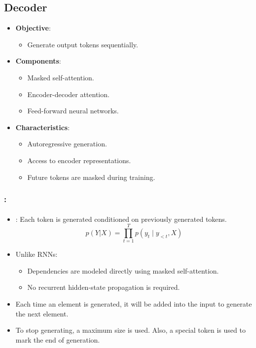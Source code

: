 \documentclass[xcolor=table]{beamer}
\begin{document}
	\subsection{Decoder}
	
	\begin{subsectionframe}
		\begin{itemize}
			
			\item \textbf{Objective}:
			\begin{itemize}
				\item Generate output tokens sequentially.
			\end{itemize}
			
			\item \textbf{Components}:
			\begin{itemize}
				\item Masked self-attention.
				\item Encoder-decoder attention.
				\item Feed-forward neural networks.
			\end{itemize}
			
			\item \textbf{Characteristics}:
			\begin{itemize}
				\item Autoregressive generation.
				\item Access to encoder representations.
				\item Future tokens are masked during training.
			\end{itemize}
			
		\end{itemize}
	\end{subsectionframe}
	
	\begin{frame}
		\frametitle{\insertshortsubtitle: \insertsection}
		\framesubtitle{\insertsubsection}
		
		\begin{itemize}
			\item {}: Each token is generated conditioned on previously generated tokens.
			\[p(Y|X) = \prod_{t=1}^{T} p(y_t \mid y_{<t}, X)\]
			
			\item Unlike RNNs:
			\begin{itemize}
				\item Dependencies are modeled directly using masked self-attention.
				\item No recurrent hidden-state propagation is required.
			\end{itemize}
			
			\item Each time an element is generated, it will be added into the input to generate the next element.
			\item To stop generating, a maximum size is used. Also, a special token is used to mark the end of generation.
		\end{itemize}
		
	\end{frame}
	
\end{document}
